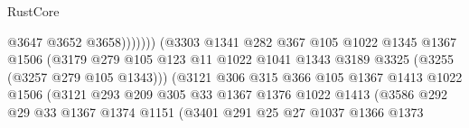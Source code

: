 \begin{lexlean}{RustCore}
\begin{coremodule}
                                                  @3647
                                                  @3652
                                                  @3658)))))))
                                    (@3303
                                      @1341
                                      @282
                                      @367
                                      @105
                                      @1022
                                      @1345
                                      @1367
                                      @1506
                                      (@3179
                                        @279
                                        @105
                                        @123
                                        @11
                                        @1022
                                        @1041
                                        @1343
                                        @3189
                                        @3325
                                        (@3255 (@3257 @279 @105 @1343)))
                                      (@3121
                                        @306
                                        @315
                                        @366
                                        @105
                                        @1367
                                        @1413
                                        @1022
                                        @1506
                                        (@3121
                                          @293
                                          @209
                                          @305
                                          @33
                                          @1367
                                          @1376
                                          @1022
                                          @1413
                                          (@3586
                                            @292
                                            @29
                                            @33
                                            @1367
                                            @1374
                                            @1151
                                            (@3401
                                              @291
                                              @25
                                              @27
                                              @1037
                                              @1366
                                              @1373

\end{coremodule}
\end{lexlean}
